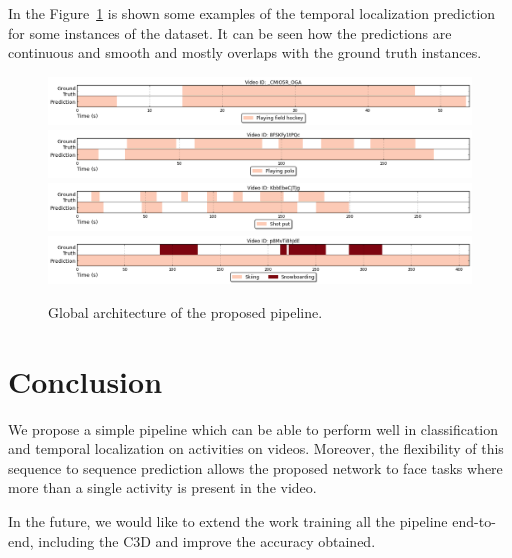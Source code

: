 \documentclass{article}
\begin{document}
In the Figure~\ref{fig:example_results} is shown some examples of the temporal localization prediction for some instances of the dataset. It can be seen how the predictions are continuous and smooth and mostly overlaps with the ground truth instances.

\begin{figure}[ht]
\centering
\includegraphics[width=1\linewidth]{img/activity_temporal_localization_8.png}
\includegraphics[width=1\linewidth]{img/activity_temporal_localization_11.png}
\includegraphics[width=1\linewidth]{img/activity_temporal_localization_20.png}
\includegraphics[width=1\linewidth]{img/activity_temporal_localization_35.png}

\caption{Global architecture of the proposed pipeline.}
\label{fig:example_results}
\end{figure}

\section{Conclusion}

We propose a simple pipeline which can be able to perform well in classification and temporal localization on activities on videos.
Moreover, the flexibility of this sequence to sequence prediction allows the proposed network to face tasks where more than a single activity is present in the video.


In the future, we would like to extend the work training all the pipeline end-to-end, including the C3D and improve the accuracy obtained.

\section*{}
{\small


}
\end{document}
